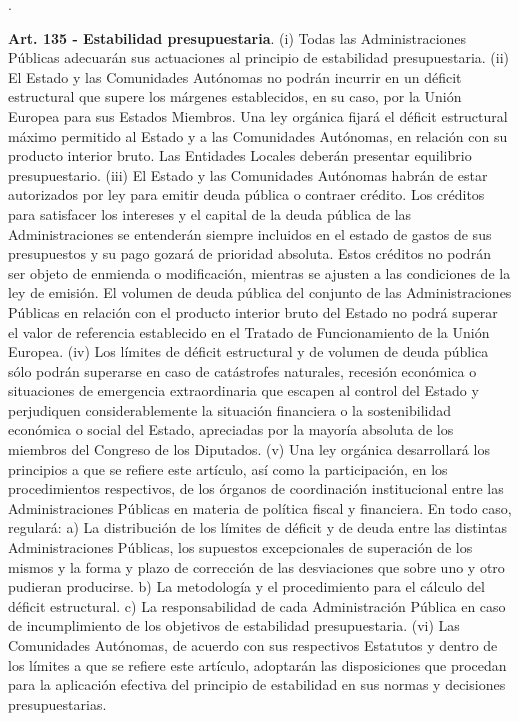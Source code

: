 \documentclass[10pt,a4paper]{article}
\newcounter{numitem}
\newenvironment{lnum}
      {\begin{list}{\arabic{numitem}.}{%
          \usecounter{numitem}%
          \setlength{\leftmargin}{1cm}%
          \setlength{\parskip}{3pt}%
          \setlength{\itemsep}{0pt}%
          \setlength{\parsep}{0pt}%
      }}
      {\end{list}}
\begin{document}
\begin{lnum}
    \item \textbf{Art. 135 - Estabilidad presupuestaria}. (i) Todas las Administraciones Públicas adecuarán sus actuaciones al principio de estabilidad presupuestaria. (ii) El Estado y las Comunidades Autónomas no podrán incurrir en un déficit estructural que supere los márgenes establecidos, en su caso, por la Unión Europea para sus Estados Miembros. Una ley orgánica fijará el déficit estructural máximo permitido al Estado y a las Comunidades Autónomas, en relación con su producto interior bruto. Las Entidades Locales deberán presentar equilibrio presupuestario. (iii) El Estado y las Comunidades Autónomas habrán de estar autorizados por ley para emitir deuda pública o contraer crédito. Los créditos para satisfacer los intereses y el capital de la deuda pública de las Administraciones se entenderán siempre incluidos en el estado de gastos de sus presupuestos y su pago gozará de prioridad absoluta. Estos créditos no podrán ser objeto de enmienda o modificación, mientras se ajusten a las condiciones de la ley de emisión. El volumen de deuda pública del conjunto de las Administraciones Públicas en relación con el producto interior bruto del Estado no podrá superar el valor de referencia establecido en el Tratado de Funcionamiento de la Unión Europea. (iv) Los límites de déficit estructural y de volumen de deuda pública sólo podrán superarse en caso de catástrofes naturales, recesión económica o situaciones de emergencia extraordinaria que escapen al control del Estado y perjudiquen considerablemente la situación financiera o la sostenibilidad económica o social del Estado, apreciadas por la mayoría absoluta de los miembros del Congreso de los Diputados. (v) Una ley orgánica desarrollará los principios a que se refiere este artículo, así como la participación, en los procedimientos respectivos, de los órganos de coordinación institucional entre las Administraciones Públicas en materia de política fiscal y financiera. En todo caso, regulará: a) La distribución de los límites de déficit y de deuda entre las distintas Administraciones Públicas, los supuestos excepcionales de superación de los mismos y la forma y plazo de corrección de las desviaciones que sobre uno y otro pudieran producirse. b) La metodología y el procedimiento para el cálculo del déficit estructural. c) La responsabilidad de cada Administración Pública en caso de incumplimiento de los objetivos de estabilidad presupuestaria. (vi) Las Comunidades Autónomas, de acuerdo con sus respectivos Estatutos y dentro de los límites a que se refiere este artículo, adoptarán las disposiciones que procedan para la aplicación efectiva del principio de estabilidad en sus normas y decisiones presupuestarias.

\end{lnum}
\end{document}
